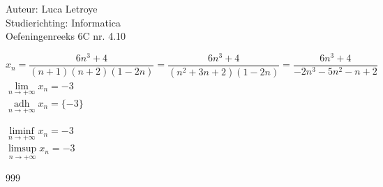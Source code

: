 \documentclass[a4paper]{article}
\begin{document}
  
\noindent \large Auteur: Luca Letroye \\
\noindent \large Studierichting: Informatica\\
\noindent \large Oefeningenreeks 6C nr. 4.10

\medskip
\normalsize

$x_n = \dfrac{6n^3+4}{(n+1)(n+2)(1-2n)} =  \dfrac{6n^3+4}{(n^2+3n+2)(1-2n)} = \dfrac{6n^3+4}{-2n^3-5n^2-n+2}$\\

$\lim\limits_{n \rightarrow +\infty} x_n = -3$\\

$\operatorname*{adh}\limits_{n \rightarrow +\infty} x_n = \{ -3 \}$

$\liminf\limits_{n \rightarrow +\infty} x_n =-3$\\

$\limsup\limits_{n \rightarrow +\infty} x_n =-3$\\






\begin{thebibliography}{999}
\end{thebibliography}
\end{document}

